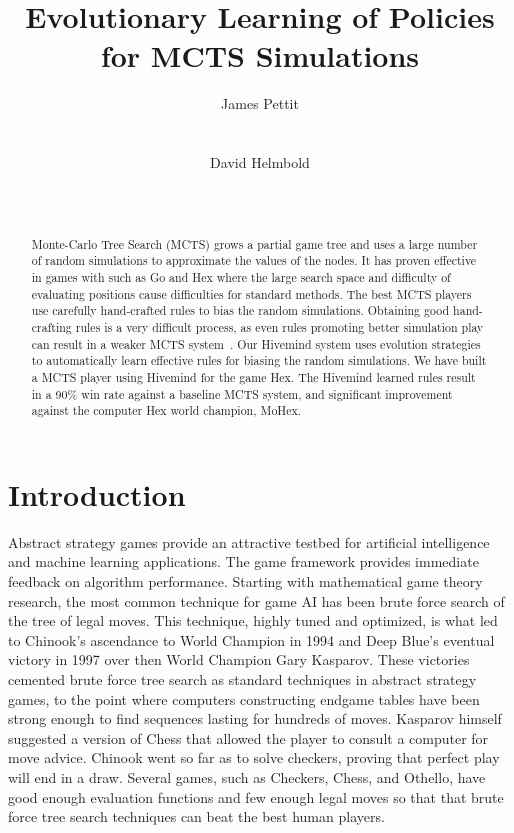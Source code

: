 \documentclass{acm_proc_article-sp}
\title{Evolutionary Learning of Policies for MCTS Simulations}
\author{ 
%
%
\alignauthor
James Pettit \\
       \affaddr{U.C. Santa Cruz}\\
       \affaddr{Santa Cruz, California}\\
       \email{ jpettit@soe.ucsc.edu}
\alignauthor
David Helmbold \\
       \affaddr{U.C. Santa Cruz}\\
       \affaddr{Santa Cruz, California}\\
       \email{dph@soe.ucsc.edu}
}
\begin{document}
\maketitle

\begin{abstract}
Monte-Carlo Tree Search (MCTS) 
grows a partial game tree and uses a large number of random simulations to
approximate the values of the nodes.   
It has proven effective in games with such as Go and Hex where the large search space and
difficulty of evaluating positions cause difficulties for standard methods.
The best MCTS players use carefully hand-crafted rules to bias the random simulations.
Obtaining good  hand-crafting rules is a very difficult process, as even rules promoting better
simulation play can result in a weaker MCTS system~\cite{gelly2006modification}.
Our Hivemind system uses evolution strategies to automatically learn effective rules for biasing the 
random simulations.
We have built a MCTS player using Hivemind for the game Hex. 
The Hivemind learned rules result in a 90\% win rate against a baseline MCTS system, and 
significant improvement against the computer Hex world champion, MoHex.
\end{abstract}


\section{Introduction}
Abstract strategy games provide an attractive testbed for artificial intelligence and machine learning applications. The game framework provides immediate feedback on algorithm performance. 
Starting with mathematical game theory research, the most common technique for game AI has been brute force search of the tree of legal moves. 
This technique, highly tuned and optimized, is what led to Chinook's ascendance to World Champion in 1994 and Deep Blue's eventual victory in 1997 over then World Champion Gary Kasparov. These victories cemented brute force tree search as standard techniques in abstract strategy games, to the point where computers constructing endgame tables have been strong enough to find sequences lasting for hundreds of moves. Kasparov himself suggested a version of Chess that allowed the player to consult a computer for move advice. Chinook went so far as to solve checkers, proving that perfect play will end in a draw. 
Several games, such as  Checkers, Chess, and Othello, have good enough evaluation functions and few enough legal moves so that that brute force tree search techniques can beat the best human players.
\end{document}
